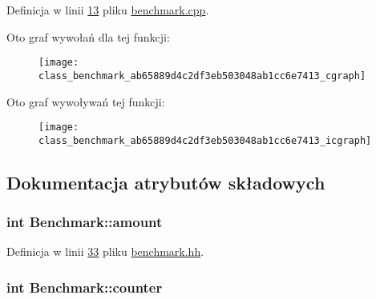 Definicja w linii \hyperlink{benchmark_8cpp_source_l00013}{13} pliku \hyperlink{benchmark_8cpp_source}{benchmark.\-cpp}.



Oto graf wywołań dla tej funkcji\-:
\nopagebreak
\begin{figure}[H]
\begin{center}
\leavevmode
\texttt{[image: class\_benchmark\_ab65889d4c2df3eb503048ab1cc6e7413\_cgraph]}
\end{center}
\end{figure}




Oto graf wywoływań tej funkcji\-:
\nopagebreak
\begin{figure}[H]
\begin{center}
\leavevmode
\texttt{[image: class\_benchmark\_ab65889d4c2df3eb503048ab1cc6e7413\_icgraph]}
\end{center}
\end{figure}




\subsection{Dokumentacja atrybutów składowych}
\hypertarget{class_benchmark_a1d0eaa6febe9b7a7f5f5147e83f60910}{
\subsubsection[{amount}]{\setlength{\rightskip}{0pt plus 5cm}int Benchmark\-::amount\hspace{0.3cm}{\ttfamily [private]}}}\label{class_benchmark_a1d0eaa6febe9b7a7f5f5147e83f60910}


Definicja w linii \hyperlink{benchmark_8hh_source_l00033}{33} pliku \hyperlink{benchmark_8hh_source}{benchmark.\-hh}.

\hypertarget{class_benchmark_a3a56c7dad0b21e490f3024d5d0027f31}{
\subsubsection[{counter}]{\setlength{\rightskip}{0pt plus 5cm}int Benchmark\-::counter\hspace{0.3cm}{\ttfamily [private]}}}\label{class_benchmark_a3a56c7dad0b21e490f3024d5d0027f31}


